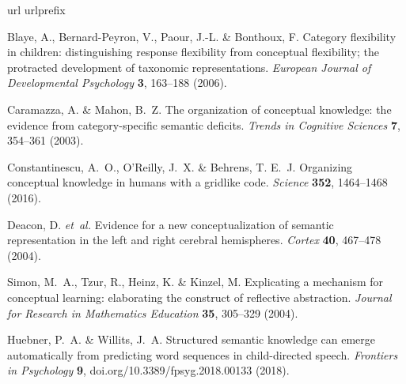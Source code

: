 \documentclass[10pt]{article}
\begin{document}
\begin{thebibliography}{99}

\expandafter\ifx\csname url\endcsname\relax
  \def\url#1{\texttt{#1}}\fi
\expandafter\ifx\csname urlprefix\endcsname\relax\def\urlprefix{URL }\fi
\providecommand{\bibinfo}[2]{#2}
\providecommand{\eprint}[2][]{\url{#2}}

\bibinfo{author}{Blaye, A.}, \bibinfo{author}{Bernard-Peyron, V.},
  \bibinfo{author}{Paour, J.-L.} \& \bibinfo{author}{Bonthoux, F.}
\newblock \bibinfo{title}{Category flexibility in children: distinguishing
  response flexibility from conceptual flexibility; the protracted development
  of taxonomic representations}.
\newblock \emph{\bibinfo{journal}{{European} Journal of Developmental
  Psychology}} \textbf{\bibinfo{volume}{3}}, \bibinfo{pages}{163--188}
  (\bibinfo{year}{2006}).

\bibinfo{author}{Caramazza, A.} \& \bibinfo{author}{Mahon, B.~Z.}
\newblock \bibinfo{title}{The organization of conceptual knowledge: the
  evidence from category-specific semantic deficits}.
\newblock \emph{\bibinfo{journal}{Trends in Cognitive Sciences}}
  \textbf{\bibinfo{volume}{7}}, \bibinfo{pages}{354--361}
  (\bibinfo{year}{2003}).

\bibinfo{author}{Constantinescu, A.~O.}, \bibinfo{author}{O'Reilly, J.~X.} \&
  \bibinfo{author}{Behrens, T. E.~J.}
\newblock \bibinfo{title}{Organizing conceptual knowledge in humans with a
  gridlike code}.
\newblock \emph{\bibinfo{journal}{Science}} \textbf{\bibinfo{volume}{352}},
  \bibinfo{pages}{1464--1468} (\bibinfo{year}{2016}).

\bibinfo{author}{Deacon, D.} \emph{et~al.}
\newblock \bibinfo{title}{Evidence for a new conceptualization of semantic
  representation in the left and right cerebral hemispheres}.
\newblock \emph{\bibinfo{journal}{Cortex}} \textbf{\bibinfo{volume}{40}},
  \bibinfo{pages}{467--478} (\bibinfo{year}{2004}).

\bibinfo{author}{Simon, M.~A.}, \bibinfo{author}{Tzur, R.},
  \bibinfo{author}{Heinz, K.} \& \bibinfo{author}{Kinzel, M.}
\newblock \bibinfo{title}{Explicating a mechanism for conceptual learning:
  elaborating the construct of reflective abstraction}.
\newblock \emph{\bibinfo{journal}{Journal for Research in Mathematics
  Education}} \textbf{\bibinfo{volume}{35}}, \bibinfo{pages}{305--329}
  (\bibinfo{year}{2004}).

\bibinfo{author}{Huebner, P.~A.} \& \bibinfo{author}{Willits, J.~A.}
\newblock \bibinfo{title}{Structured semantic knowledge can emerge
  automatically from predicting word sequences in child-directed speech}.
\newblock \emph{\bibinfo{journal}{Frontiers in Psychology}}
  \textbf{\bibinfo{volume}{9}},
  \bibinfo{pages}{doi.org/10.3389/fpsyg.2018.00133} (\bibinfo{year}{2018}).


\end{thebibliography}
\end{document}
